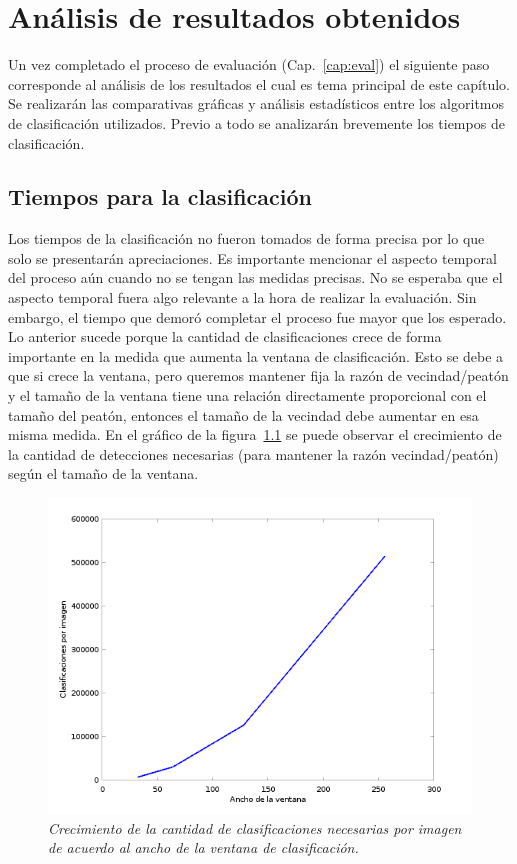
\chapter{Análisis de resultados obtenidos}
\label{cap:analisis}

Un vez completado el proceso de evaluación (Cap.~\ref{cap:eval}) el siguiente paso corresponde al análisis de los resultados el cual es tema principal de este capítulo. Se realizarán las comparativas gráficas y análisis estadísticos entre los algoritmos de clasificación utilizados. Previo a todo se analizarán brevemente los tiempos de clasificación.

\section{Tiempos para la clasificación}

Los tiempos de la clasificación no fueron tomados de forma precisa por lo que solo se presentarán apreciaciones. Es importante mencionar el aspecto temporal del proceso aún cuando no se tengan las medidas precisas. No se esperaba que el aspecto temporal fuera algo relevante a la hora de realizar la evaluación. Sin embargo, el tiempo que demoró completar el proceso fue mayor que los esperado. Lo anterior sucede porque la cantidad de clasificaciones crece de forma importante en la medida que aumenta la ventana de clasificación. Esto se debe a que si crece la ventana, pero queremos mantener fija la razón de vecindad/peatón y el tamaño de la ventana tiene una relación directamente proporcional con el tamaño del peatón, entonces el tamaño de la vecindad debe aumentar en esa misma medida. En el gráfico de la figura~\ref{fig:grow} se puede observar el crecimiento de la cantidad de detecciones necesarias (para mantener la razón vecindad/peatón) según el tamaño de la ventana. 

\begin{figure}[htc]
  \centering
  \includegraphics[scale=.6]{images/clasgrow}
  \caption{\em Crecimiento de la cantidad de clasificaciones necesarias por imagen de acuerdo al ancho de la ventana de clasificación.}  
  \label{fig:grow}
\end{figure}

